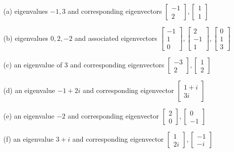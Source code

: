 \documentclass[12pt]{article}
\begin{document}
\begin{itemize}
    \item[(a)] eigenvalues \(-1, 3\) and corresponding eigenvectors \( \begin{bmatrix} -1 \\ 2 \end{bmatrix}, \begin{bmatrix} 1 \\ 1 \end{bmatrix} \)
    \item[(b)] eigenvalues \(0, 2, -2\) and associated eigenvectors \( \begin{bmatrix} -1 \\ 1 \\ 0 \end{bmatrix}, \begin{bmatrix} 2 \\ -1 \\ 1 \end{bmatrix}, \begin{bmatrix} 0 \\ 1 \\ 3 \end{bmatrix} \)
    \item[(c)] an eigenvalue of \(3\) and corresponding eigenvectors \( \begin{bmatrix} -3 \\ 2 \end{bmatrix}, \begin{bmatrix} 1 \\ 2 \end{bmatrix} \)
    \item[(d)] an eigenvalue \(-1 + 2i\) and corresponding eigenvector \( \begin{bmatrix} 1 + i \\ 3i \end{bmatrix} \)
    \item[(e)] an eigenvalue \(-2\) and corresponding eigenvector \( \begin{bmatrix} 2 \\ 0 \end{bmatrix}, \begin{bmatrix} 0 \\ -1 \end{bmatrix} \)
    \item[(f)] an eigenvalue \(3 + i\) and corresponding eigenvector \( \begin{bmatrix} 1 \\ 2i \end{bmatrix}, \begin{bmatrix} -1 \\ -i \end{bmatrix} \)
\end{itemize}
\end{document}

